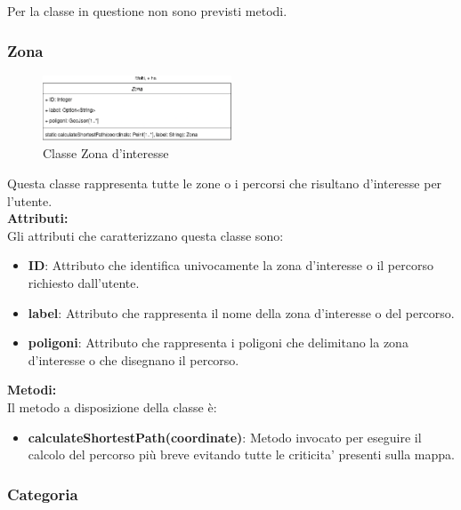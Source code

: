\documentclass{article}
\begin{document}
Per la classe in questione non sono previsti metodi.

\clearpage 

\subsubsection{Zona}

\begin{figure}[htbp]
	\centering
	\includegraphics[width=0.5\textwidth]{Images/Zona-Class.png}
	\caption{Classe Zona d'interesse}
	\label{fig:zona}
\end{figure}

Questa classe rappresenta tutte le zone o i percorsi che risultano d'interesse per l'utente.\\

\textbf{Attributi:}\\
Gli attributi che caratterizzano questa classe sono:
\begin{itemize}
	\item \textbf{ID}: Attributo che identifica univocamente la zona d'interesse o il percorso richiesto dall'utente.
	\item \textbf{label}: Attributo che rappresenta il nome della zona d'interesse o del percorso.
	\item \textbf{poligoni}: Attributo che rappresenta i poligoni che delimitano la zona d'interesse o che disegnano il percorso.\\
\end{itemize}

\textbf{Metodi:}\\
Il metodo a disposizione della classe è:
\begin{itemize}
	\item \textbf{calculateShortestPath(coordinate)}: Metodo invocato per eseguire il calcolo del percorso più breve evitando tutte le criticita' presenti sulla mappa.
\end{itemize}

\clearpage

\subsubsection{Categoria}
\end{document}

